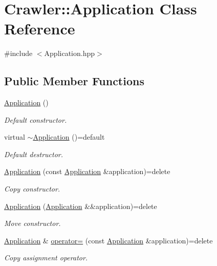 \hypertarget{class_crawler_1_1_application}{}\section{Crawler\+:\+:Application Class Reference}
\label{class_crawler_1_1_application}


{\ttfamily \#include $<$Application.\+hpp$>$}

\subsection*{Public Member Functions}
\begin{DoxyCompactItemize}
\item 
\hyperlink{class_crawler_1_1_application_acf656ce91b631690e20404f6b4d01f7f}{Application} ()
\begin{DoxyCompactList}\small\item\em Default constructor. \end{DoxyCompactList}\item 
virtual \hyperlink{class_crawler_1_1_application_a2c8754469bd6c0722a7077e39775867c}{$\sim$\+Application} ()=default
\begin{DoxyCompactList}\small\item\em Default destructor. \end{DoxyCompactList}\item 
\hyperlink{class_crawler_1_1_application_a3f14969f49a9cbfb58ae0976aa65223d}{Application} (const \hyperlink{class_crawler_1_1_application}{Application} \&application)=delete
\begin{DoxyCompactList}\small\item\em Copy constructor. \end{DoxyCompactList}\item 
\hyperlink{class_crawler_1_1_application_a72a0ae0583df3520ae43af8421eec28b}{Application} (\hyperlink{class_crawler_1_1_application}{Application} \&\&application)=delete
\begin{DoxyCompactList}\small\item\em Move constructor. \end{DoxyCompactList}\item 
\hyperlink{class_crawler_1_1_application}{Application} \& \hyperlink{class_crawler_1_1_application_aebd607d398cd26488c0216b2def97f4e}{operator=} (const \hyperlink{class_crawler_1_1_application}{Application} \&application)=delete
\begin{DoxyCompactList}\small\item\em Copy assignment operator. \end{DoxyCompactList}\item 

\end{DoxyCompactItemize}
